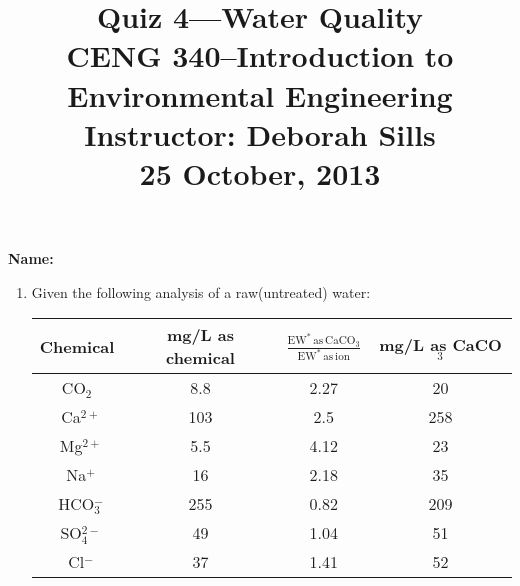 \documentclass[12pt,letterpaper]{article}
\begin{document}
\setlength{\parindent}{0cm} 


\frenchspacing


\title {\Large{\textbf{Quiz 4---Water Quality}}\\ \large{CENG 340--Introduction to Environmental Engineering\\
Instructor: Deborah Sills\\ \textbf{25 October, 2013}}}
\author {}
\date {}
\maketitle

\vspace{-0.4 in}
\textbf{\large{Name:}}\\

\begin{enumerate}

\item  Given the following analysis of a raw(untreated) water:\\



\begin{minipage}{\linewidth}
\centering

\begin{tabular}{|c|c|c|c|}\toprule[1.25pt]
 Chemical	&  mg/L as chemical 	&  $\mathrm{\frac{EW^*\, as\, CaCO_3}{EW^*\, as\, ion}}$ &  mg/L as CaCO$_3$	\\\midrule
CO$_2$ & 8.8 & 2.27 & 20\\ \hline\
Ca$^{2+}$ & 103 & 2.5 & 258\\ \hline\
Mg$^{2+}$ & 5.5 & 4.12 & 23\\ \hline\
Na$^+$ & 16 & 2.18 & 35\\ \hline\
HCO$_3^-$ & 255 & 0.82 & 209\\ \hline\
SO$_4^{2-}$ & 49 & 1.04 & 51\\ \hline\
Cl$^-$ & 37 & 1.41 & 52\\

\bottomrule[1.25pt]

\end {tabular}\par
\end{minipage}\\


\end{enumerate}
\end{document}
